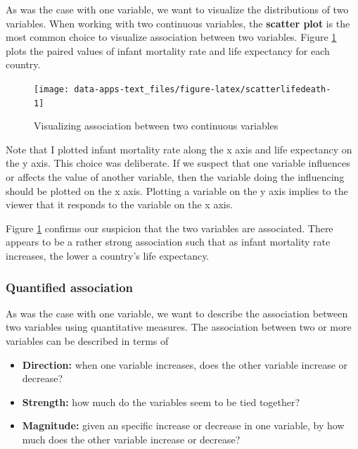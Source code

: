 \documentclass[
]{book}
\providecommand{\tightlist}{%
  \setlength{\itemsep}{0pt}\setlength{\parskip}{0pt}}
\begin{document}
As was the case with one variable, we want to visualize the distributions of two variables. When working with two continuous variables, the \textbf{scatter plot} is the most common choice to visualize association between two variables. Figure \ref{fig:scatterlifedeath} plots the paired values of infant mortality rate and life expectancy for each country.

\begin{figure}

{\centering \texttt{[image: data-apps-text\_files/figure-latex/scatterlifedeath-1]} 

}

\caption{Visualizing association between two continuous variables}\label{fig:scatterlifedeath}
\end{figure}

Note that I plotted infant mortality rate along the x axis and life expectancy on the y axis. This choice was deliberate. If we suspect that one variable influences or affects the value of another variable, then the variable doing the influencing should be plotted on the x axis. Plotting a variable on the y axis implies to the viewer that it responds to the variable on the x axis.

Figure \ref{fig:scatterlifedeath} confirms our suspicion that the two variables are associated. There appears to be a rather strong association such that as infant mortality rate increases, the lower a country's life expectancy.

\hypertarget{quantified-association}{%
\subsubsection*{Quantified association}\label{quantified-association}}

As was the case with one variable, we want to describe the association between two variables using quantitative measures. The association between two or more variables can be described in terms of

\begin{itemize}
\tightlist
\item
  \textbf{Direction:} when one variable increases, does the other variable increase or decrease?
\item
  \textbf{Strength:} how much do the variables seem to be tied together?
\item
  \textbf{Magnitude:} given an specific increase or decrease in one variable, by how much does the other variable increase or decrease?
\end{itemize}
\end{document}
